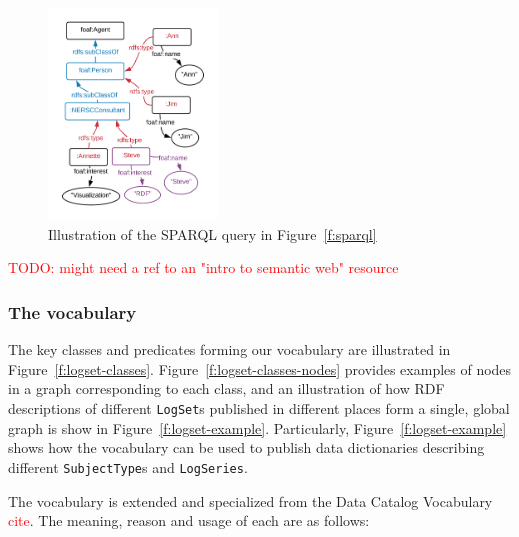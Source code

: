 \begin{figure}
\includegraphics[width=0.4\textwidth]{sparql.png}
\caption{Illustration of the SPARQL query in Figure~\ref{f:sparql} }
\label{f:sparql-diagram}
\end{figure}

\textcolor{red}{TODO: might need a ref to an "intro to semantic web" resource}


\subsubsection{The vocabulary}

The key classes and predicates forming our vocabulary are illustrated in 
Figure~\ref{f:logset-classes}. Figure~\ref{f:logset-classes-nodes} provides 
examples of nodes in a graph corresponding to each class, and an 
illustration of how RDF descriptions of different \texttt{LogSet}s published 
in different places form a single, global graph is show in 
Figure~\ref{f:logset-example}. Particularly, Figure~\ref{f:logset-example}
shows how the vocabulary can be used to publish data dictionaries 
describing different \texttt{SubjectType}s and \texttt{LogSeries}.

The vocabulary is extended and specialized 
from the Data Catalog Vocabulary \textcolor{red}{cite}. The meaning, 
reason and usage of each are as follows:

